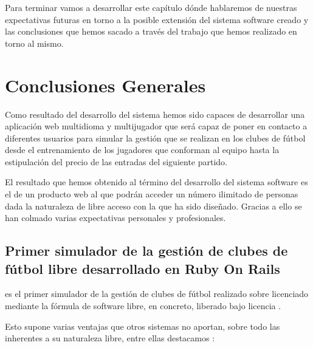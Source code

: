 

Para terminar vamos a desarrollar este capítulo dónde hablaremos de nuestras
expectativas futuras en torno a la posible extensión del sistema software creado
y las conclusiones que hemos sacado a través del trabajo que hemos realizado en
torno al mismo.

\section{Conclusiones Generales}
Como resultado del desarrollo del sistema 
hemos sido capaces de desarrollar una aplicación web multidioma y multijugador
que será capaz de poner en contacto a diferentes usuarios para simular la
gestión que se realizan en los clubes de fútbol desde el entrenamiento de los
jugadores que conforman al equipo hasta la estipulación del precio de las
entradas del siguiente partido.

El resultado que hemos obtenido al término del desarrollo del sistema software
es el de un producto web al que podrán acceder un número ilimitado de personas
dada la naturaleza de libre acceso con la que ha sido diseñado. Gracias a ello
se han colmado varias expectativas personales y profesionales.


\subsection{Primer simulador de la gestión de clubes de fútbol libre
  desarrollado en Ruby On Rails}
 es el primer simulador de la gestión de
clubes de fútbol realizado sobre  licenciado mediante la fórmula de software libre, en concreto,
liberado bajo licencia .

Esto supone varias ventajas que otros sistemas no aportan, sobre todo las
inherentes a su naturaleza libre, entre ellas destacamos \cite{fsf:what_is}:

